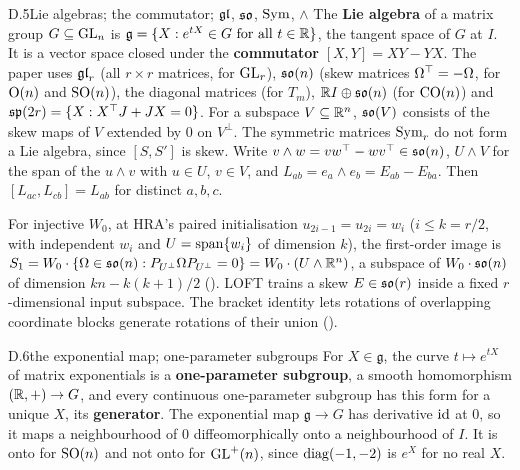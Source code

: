 \begin{bgentry}{D.5}{Lie algebras; the commutator; $\mathfrak{gl}$, $\mathfrak{so}$, $\mathrm{Sym}$, $\wedge$}
The \textbf{Lie algebra} of a matrix group $G\subseteq\mathrm{GL}_n$ is $\mathfrak g=\{X:e^{tX}\in G\text{ for all }t\in\mathbb{R}\}$,
the tangent space of $G$ at $I$. It is a vector space closed under the \textbf{commutator} $[X,Y]=XY-YX$. The paper uses
$\mathfrak{gl}_r$ (all $r\times r$ matrices, for $\mathrm{GL}_r$), $\mathfrak{so}(n)$ (skew matrices $\Omega^{\top}=-\Omega$, for $\mathrm{O}(n)$ and
$\mathrm{SO}(n)$), the diagonal matrices (for $T_m$), $\mathbb{R} I\oplus\mathfrak{so}(n)$ (for $\mathrm{CO}(n)$) and $\mathfrak{sp}(2r)=\{X:X^{\top}
J+JX=0\}$. For a subspace $V\subseteq\mathbb{R}^n$, $\mathfrak{so}(V)$ consists of the skew maps of $V$ extended by $0$ on $V^\perp$. The
symmetric matrices $\mathrm{Sym}_r$ do not form a Lie algebra, since $[S,S']$ is skew. Write $v\wedge w=vw^{\top}-wv^{\top}\in\mathfrak{so}(n)$,
$U\wedge V$ for the span of the $u\wedge v$ with $u\in U$, $v\in V$, and $L_{ab}=e_a\wedge e_b=E_{ab}-E_{ba}$. Then
$[L_{ac},L_{cb}]=L_{ab}$ for distinct $a,b,c$.
\end{bgentry}

For injective $W_0$, at HRA's paired initialisation $u_{2i-1}=u_{2i}=w_i$ ($i\le k=r/2$, with independent $w_i$ and
$U=\operatorname{span}\{w_i\}$ of dimension $k$), the first-order image is $S_1=W_0\cdot\{\Omega\in\mathfrak{so}(n):P_{U^\perp}\Omega
P_{U^\perp}=0\}=W_0\cdot(U\wedge\mathbb{R}^n)$, a subspace of $W_0\cdot\mathfrak{so}(n)$ of dimension $kn-k(k+1)/2$ (). LOFT
\citep{zhao2026loft} trains a skew $E\in\mathfrak{so}(r)$ inside a fixed $r$-dimensional input subspace. The bracket identity lets
rotations of overlapping coordinate blocks generate rotations of their union ().


\begin{bgentry}{D.6}{the exponential map; one-parameter subgroups}
For $X\in\mathfrak g$, the curve $t\mapsto e^{tX}$ of matrix exponentials is a \textbf{one-parameter subgroup}, a smooth
homomorphism $(\mathbb{R},+)\to G$, and every continuous one-parameter subgroup has this form for a unique $X$, its
\textbf{generator}. The exponential map $\mathfrak g\to G$ has derivative $\mathrm{id}$ at $0$, so it maps a neighbourhood of
$0$ diffeomorphically onto a neighbourhood of $I$. It is onto for $\mathrm{SO}(n)$ and not onto for $\mathrm{GL}^+(n)$, since
$\operatorname{diag}(-1,-2)$ is $e^X$ for no real $X$.
\end{bgentry}

